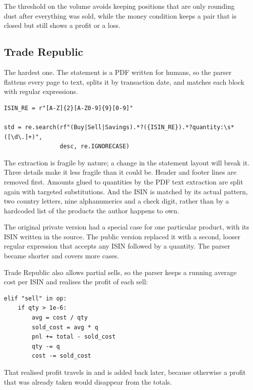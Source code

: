 The threshold on the volume avoids keeping positions that are only rounding
dust after everything was sold, while the money condition keeps a pair that is
closed but still shows a profit or a loss.

\subsection{Trade Republic}

The hardest one. The statement is a PDF written for humans, so the parser
flattens every page to text, splits it by transaction date, and matches each
block with regular expressions.

\begin{lstlisting}[style=py]
ISIN_RE = r"[A-Z]{2}[A-Z0-9]{9}[0-9]"

std = re.search(rf"(Buy|Sell|Savings).*?({ISIN_RE}).*?quantity:\s*([\d\.]+)",
                desc, re.IGNORECASE)
\end{lstlisting}

The extraction is fragile by nature; a change in the statement layout will break
it. Three details make it less fragile than it could be. Header and footer lines
are removed first. Amounts glued to quantities by the PDF text extraction are
split again with targeted substitutions. And the ISIN is matched by its actual
pattern, two country letters, nine alphanumerics and a check digit, rather than
by a hardcoded list of the products the author happens to own.

\begin{keypoint}
The original private version had a special case for one particular product, with
its ISIN written in the source. The public version replaced it with a second,
looser regular expression that accepts any ISIN followed by a quantity. The
parser became shorter and covers more cases.
\end{keypoint}

Trade Republic also allows partial sells, so the parser keeps a running average
cost per ISIN and realises the profit of each sell:

\begin{lstlisting}[style=py]
elif "sell" in op:
    if qty > 1e-6:
        avg = cost / qty
        sold_cost = avg * q
        pnl += total - sold_cost
        qty -= q
        cost -= sold_cost
\end{lstlisting}

That realised profit travels in  and is added back
later, because otherwise a profit that was already taken would disappear from
the totals.

